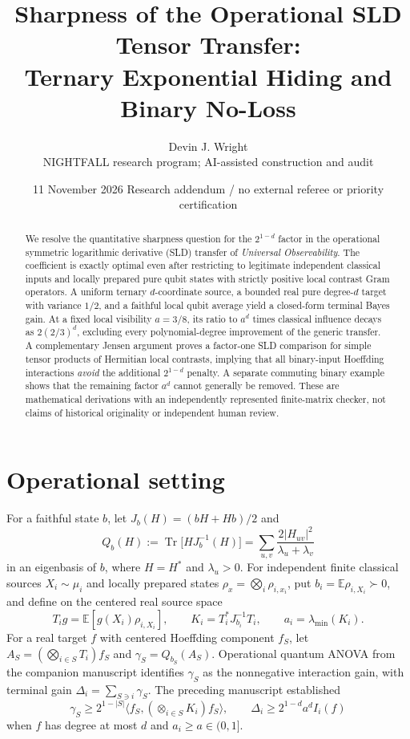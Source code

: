 \documentclass[11pt]{article}
\title{\bf Sharpness of the Operational SLD Tensor Transfer:\\ Ternary Exponential Hiding and Binary No-Loss}
\author{Devin J. Wright\\\small NIGHTFALL research program; AI-assisted construction and audit}
\date{11 November 2026 \quad\small Research addendum / no external referee or priority certification}
\newcommand{\E}{\mathbb E}
\newcommand{\Tr}{\operatorname{Tr}}
\begin{document}
\maketitle
\begin{abstract}
We resolve the quantitative sharpness question for the $2^{1-d}$ factor in the operational symmetric logarithmic derivative (SLD) transfer of \emph{Universal Observability}. The coefficient is exactly optimal even after restricting to legitimate independent classical inputs and locally prepared pure qubit states with strictly positive local contrast Gram operators. A uniform ternary $d$-coordinate source, a bounded real pure degree-$d$ target with variance $1/2$, and a faithful local qubit average yield a closed-form terminal Bayes gain. At a fixed local visibility $a=3/8$, its ratio to $a^d$ times classical influence decays as $2(2/3)^d$, excluding every polynomial-degree improvement of the generic transfer. A complementary Jensen argument proves a factor-one SLD comparison for simple tensor products of Hermitian local contrasts, implying that all binary-input Hoeffding interactions \emph{avoid} the additional $2^{1-d}$ penalty. A separate commuting binary example shows that the remaining factor $a^d$ cannot generally be removed. These are mathematical derivations with an independently represented finite-matrix checker, not claims of historical originality or independent human review.
\end{abstract}

\section{Operational setting}
For a faithful state $b$, let $J_b(H)=(bH+Hb)/2$ and
\[
 Q_b(H):=\Tr\bigl[H J_b^{-1}(H)\bigr]=\sum_{u,v}\frac{2|H_{uv}|^2}{\lambda_u+\lambda_v}
\]
in an eigenbasis of $b$, where $H=H^*$ and $\lambda_u>0$. For independent finite classical sources $X_i\sim\mu_i$ and locally prepared states $\rho_x=\bigotimes_i\rho_{i,x_i}$, put $b_i=\E\rho_{i,X_i}\succ0$, and define on the centered real source space
\[
 T_i g=\E[g(X_i)\rho_{i,X_i}],\qquad K_i=T_i^*J_{b_i}^{-1}T_i,\qquad a_i=\lambda_{\min}(K_i).
\]
For a real target $f$ with centered Hoeffding component $f_S$, let $A_S=(\bigotimes_{i\in S}T_i)f_S$ and $\gamma_S=Q_{b_S}(A_S)$. Operational quantum ANOVA from the companion manuscript identifies $\gamma_S$ as the nonnegative interaction gain, with terminal gain $\Delta_i=\sum_{S\ni i}\gamma_S$.
The preceding manuscript established
\begin{equation}\label{eq:envelope}
\gamma_S\ge 2^{1-|S|}\langle f_S,(\otimes_{i\in S}K_i)f_S\rangle,
\qquad \Delta_i\ge 2^{1-d}a^d I_i(f)
\end{equation}
when $f$ has degree at most $d$ and $a_i\ge a\in(0,1]$.
\end{document}
